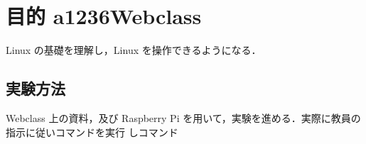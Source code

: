 \documentclass{myreport}  %
\begin{document}
\section{目的 a1236Webclass}
Linux の基礎を理解し，Linux を操作できるようになる．

\subsection{実験方法}
Webclass 上の資料，及び Raspberry Pi を用いて，実験を進める．実際に教員の指示に従いコマンドを実行
しコマンド
\end{document}
